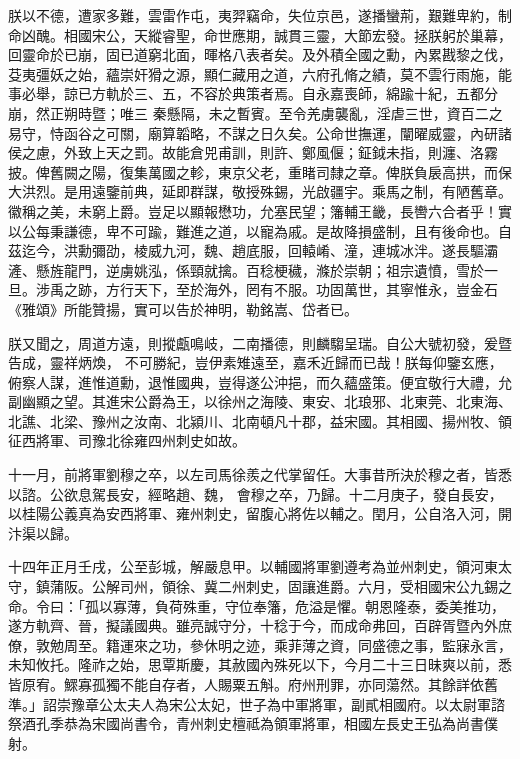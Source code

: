 \begin{pinyinscope}
 朕以不德，遭家多難，雲雷作屯，夷羿竊命，失位京邑，遂播蠻荊，艱難卑約，制命凶醜。相國宋公，天縱睿聖，命世應期，誠貫三靈，大節宏發。拯朕躬於巢幕，回靈命於已崩，固已道窮北面，暉格八表者矣。及外積全國之勳，內累戡黎之伐，芟夷彊妖之始，蘊崇奸猾之源，顯仁藏用之道，六府孔脩之績，莫不雲行雨施，能事必舉，諒已方軌於三、五，不容於典策者焉。自永嘉喪師，綿踰十紀，五都分崩，然正朔時暨；唯三
 秦懸隔，未之暫賓。至令羌虜襲亂，淫虐三世，資百二之易守，恃函谷之可關，廟算韜略，不謀之日久矣。公命世撫運，闡曜威靈，內研諸侯之慮，外致上天之罰。故能倉兕甫訓，則許、鄭風偃；鉦鉞未指，則瀍、洛霧披。俾舊闕之陽，復集萬國之軫，東京父老，重睹司隸之章。俾朕負扆高拱，而保大洪烈。是用遠鑒前典，延即群謀，敬授殊錫，光啟疆宇。乘馬之制，有陋舊章。徽稱之美，未窮上爵。豈足以顯報懋功，允塞民望；籓輔王畿，長轡六合者乎！實
 以公每秉謙德，卑不可踰，難進之道，以寵為戚。是故降損盛制，且有後命也。自茲迄今，洪勳彌劭，棱威九河，魏、趙底服，回轅崤、潼，連城冰泮。遂長驅灞滻、懸旌龍門，逆虜姚泓，係頸就擒。百稔梗穢，滌於崇朝；祖宗遺憤，雪於一旦。涉禹之跡，方行天下，至於海外，罔有不服。功固萬世，其寧惟永，豈金石《雅頌》所能贊揚，實可以告於神明，勒銘嵩、岱者已。



 朕又聞之，周道方遠，則摐甗鳴岐，二南播德，則麟騶呈瑞。自公大號初發，爰暨告成，靈祥炳煥，
 不可勝紀，豈伊素雉遠至，嘉禾近歸而已哉！朕每仰鑒玄應，俯察人謀，進惟道勳，退惟國典，豈得遂公沖挹，而久蘊盛策。便宜敬行大禮，允副幽顯之望。其進宋公爵為王，以徐州之海陵、東安、北琅邪、北東莞、北東海、北譙、北梁、豫州之汝南、北潁川、北南頓凡十郡，益宋國。其相國、揚州牧、領征西將軍、司豫北徐雍四州刺史如故。



 十一月，前將軍劉穆之卒，以左司馬徐羨之代掌留任。大事昔所決於穆之者，皆悉以諮。公欲息駕長安，經略趙、魏，
 會穆之卒，乃歸。十二月庚子，發自長安，以桂陽公義真為安西將軍、雍州刺史，留腹心將佐以輔之。閏月，公自洛入河，開汴渠以歸。



 十四年正月壬戌，公至彭城，解嚴息甲。以輔國將軍劉遵考為並州刺史，領河東太守，鎮蒲阪。公解司州，領徐、冀二州刺史，固讓進爵。六月，受相國宋公九錫之命。令曰：「孤以寡薄，負荷殊重，守位奉籓，危溢是懼。朝恩隆泰，委美推功，遂方軌齊、晉，擬議國典。雖亮誠守分，十稔于今，而成命弗回，百辟胥暨內外庶
 僚，敦勉周至。籍運來之功，參休明之迹，乘菲薄之資，同盛德之事，監寐永言，未知攸托。隆祚之始，思覃斯慶，其赦國內殊死以下，今月二十三日昧爽以前，悉皆原宥。鰥寡孤獨不能自存者，人賜粟五斛。府州刑罪，亦同蕩然。其餘詳依舊準。」詔崇豫章公太夫人為宋公太妃，世子為中軍將軍，副貳相國府。以太尉軍諮祭酒孔季恭為宋國尚書令，青州刺史檀祗為領軍將軍，相國左長史王弘為尚書僕射。




\end{pinyinscope}
